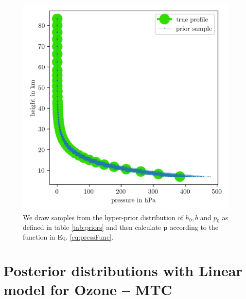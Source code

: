 \begin{figure}[ht!]
	\centering
	\includegraphics{PriorPressPostMeanSigm.png}
	\caption[Prior Samples of $\bm{p}$ according to the respective hyper-prior distribution.]{We draw samples from the hyper-prior distribution of $h_0, b$ and $p_0$ as defined in table \ref{tab:priors} and then calculate $\bm{p}$ according to the function in Eq. \ref{eq:pressFunc}.}
	\label{fig:PriorPress}
\end{figure}


\section{Posterior distributions with Linear model for Ozone -- MTC}

